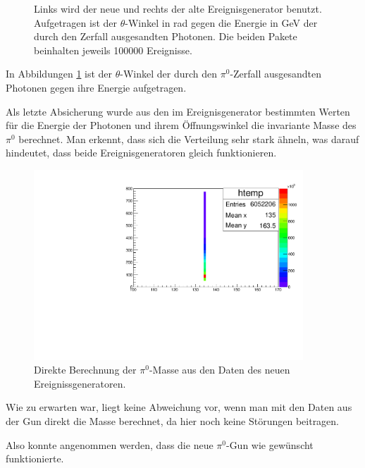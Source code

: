 \documentclass[a4paper,11pt,oneside,final,german,openbib,pdftex]{scrbook}
\begin{document}
{\begin{figure}[h!]
	\caption[Simulation: Vergleich der der Ereignisgeneratoren]{Links wird der neue und rechts der alte Ereignisgenerator benutzt. Aufgetragen ist der $\theta$-Winkel in rad gegen die Energie in GeV der durch den Zerfall ausgesandten Photonen. Die beiden Pakete beinhalten jeweils 100000 Ereignisse.}
	\label{fig:Vergleich-der-beiden-Guns}
\end{figure}

In Abbildungen \ref{fig:Vergleich-der-beiden-Guns} ist der $\theta$-Winkel der durch den $\pi^0$-Zerfall ausgesandten Photonen gegen ihre Energie aufgetragen. 


Als letzte Absicherung wurde aus den im Ereignisgenerator bestimmten Werten f\"ur die Energie der Photonen und ihrem \"Offnungswinkel die invariante Masse des $\pi^0$ berechnet.
Man erkennt, dass sich die Verteilung sehr stark \"ahneln, was darauf hindeutet, dass beide Ereignisgeneratoren gleich funktionieren.
\begin{figure}[h!]
	\centering

		\centering
		\includegraphics[width=0.9\textwidth]{20172504MCTrueME1}
		\caption[Simulation: Direkte Berechnung der $\pi^0$-Masse aus dem neuen Ereignisgenerator]{Direkte Berechnung der $\pi^0$-Masse aus den Daten des neuen Ereignissgeneratoren.}

\end{figure}

Wie zu erwarten war, liegt keine Abweichung vor, wenn man mit den Daten aus der Gun direkt die Masse berechnet, da hier noch keine St\"orungen beitragen.

Also konnte angenommen werden, dass die neue $\pi^0$-Gun wie gewünscht funktionierte.



}
\end{document}
